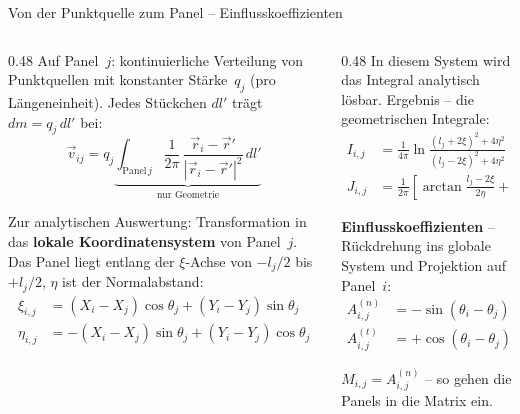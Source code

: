 \documentclass[aspectratio=169]{beamer}
\begin{document}
\begin{frame}{Von der Punktquelle zum Panel -- Einflusskoeffizienten}
\footnotesize

\begin{columns}[T]
\begin{column}{0.48\textwidth}
Auf Panel~$j$: kontinuierliche Verteilung von
Punktquellen mit konstanter Stärke~$q_j$ (pro Längeneinheit).
Jedes Stückchen $dl'$ trägt $dm\!=\!q_j\,dl'$ bei:
\vspace{-1mm}
\[
  \vec{v}_{ij} = q_j
  \underbrace{\int_{\text{Panel}\,j}
  \frac{1}{2\pi}\,
  \frac{\vec{r}_i - \vec{r}'}{|\vec{r}_i - \vec{r}'|^2}\,dl'}_{\text{nur Geometrie}}
\]

\vspace{-3mm}
Zur analytischen Auswertung: Transformation in das
\textbf{lokale Koordinatensystem} von Panel~$j$.
Das Panel liegt entlang der $\xi$-Achse von $-l_j/2$
bis $+l_j/2$, $\eta$ ist der Normalabstand:
\vspace{-1mm}
\begin{align*}
  \xi_{i,j} &= (X_i\!-\!X_j)\cos\theta_j + (Y_i\!-\!Y_j)\sin\theta_j \\[-1pt]
  \eta_{i,j} &= -(X_i\!-\!X_j)\sin\theta_j + (Y_i\!-\!Y_j)\cos\theta_j
\end{align*}
\end{column}
\begin{column}{0.48\textwidth}
In diesem System wird das Integral analytisch lösbar.
Ergebnis -- die geometrischen Integrale:
\vspace{-1mm}
\begin{align*}
  I_{i,j} &= \frac{1}{4\pi}\ln\frac{(l_j+2\xi)^2+4\eta^2}
                                     {(l_j-2\xi)^2+4\eta^2} \\[2pt]
  J_{i,j} &= \frac{1}{2\pi}\!\left[
    \arctan\frac{l_j-2\xi}{2\eta}
    + \arctan\frac{l_j+2\xi}{2\eta}\right]
\end{align*}

\vspace{-3mm}
\textbf{Einflusskoeffizienten} -- Rückdrehung ins globale
System und Projektion auf Panel~$i$:
\vspace{-1mm}
\begin{align*}
  A^{(n)}_{i,j} &= -\sin(\theta_i\!-\!\theta_j)\,I_{i,j}
                   +\cos(\theta_i\!-\!\theta_j)\,J_{i,j} \\[2pt]
  A^{(t)}_{i,j} &= +\cos(\theta_i\!-\!\theta_j)\,I_{i,j}
                   +\sin(\theta_i\!-\!\theta_j)\,J_{i,j}
\end{align*}

\vspace{-2mm}
$M_{i,j} = A^{(n)}_{i,j}$ -- so gehen die Panels in die Matrix ein.
\end{column}
\end{columns}

\end{frame}
\end{document}
